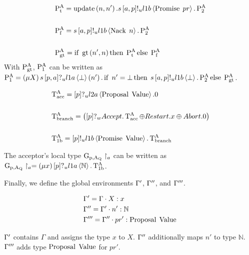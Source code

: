 \begin{align*}
&\operatorname{P^{A}_{t}} = \operatorname{update} \left(n, n'\right).s\left[a, p\right]!_u l1b \left\langle \operatorname{Promise}\; pr \right\rangle.\operatorname{P^{A}_{2}}
\\\\
&\operatorname{P^{A}_{f}} = s\left[a, p\right]!_u l1b \left\langle \operatorname{Nack}\; n \right\rangle.\operatorname{P^{A}_{2}}
\\\\
&\operatorname{P^{A}_{gt}} = \operatorname{if}\; \operatorname{gt}\left(n', n\right)\operatorname{then}\; \operatorname{P^{A}_{t}}\operatorname{else}\; \operatorname{P^{A}_{f}}
\end{align*}
With $\operatorname{P^{A}_{gt}}$, $\operatorname{P^{A}_{1}}$ can be written as $\operatorname{P^{A}_{1}} = \left(\mu X\right)s\left[p, a\right]?_u l1a \left\langle \bot \right\rangle \left(n'\right).\operatorname{if}\; n'=\bot\operatorname{then}\; s\left[a, p\right]!_u l1b \left\langle \bot \right\rangle.\operatorname{P^{A}_{2}}\operatorname{else}\; \operatorname{P^{A}_{gt}}$.

\begin{align*}    
&\operatorname{T^{A}_{acc}} = \left[p\right]?_u l2a \left\langle \operatorname{Proposal}\; \operatorname{Value} \right\rangle.0
\\\\
&\operatorname{T^{A}_{branch}} = \left(\left[p\right]?_w \mathnormal{Accept} . \operatorname{T^{A}_{acc}} \oplus \mathnormal{Restart} . x \oplus \mathnormal{Abort} .0\right)
\\\\
&\operatorname{T^{A}_{1b}} = \left[p\right]!_u l1b \left\langle \operatorname{Promise}\; \operatorname{Value} \right\rangle . \operatorname{T^{A}_{branch}}
\end{align*}

The acceptor's local type $\operatorname{G_{p, A_Q}} \upharpoonright_{a}$ can be written as $\operatorname{G_{p, A_Q}} \upharpoonright_{a} = \left(\mu x\right)\left[p\right]?_u l1a \left\langle \mathbb{N} \right\rangle.\operatorname{T^{A}_{1b}}$.

Finally, we define the global environments $\Gamma'$, $\Gamma''$, and $\Gamma'''$.

\begin{align*}
&\Gamma' = \Gamma \cdot X:x\\
&\Gamma'' = \Gamma' \cdot n':\mathbb{N}\\
&\Gamma''' = \Gamma'' \cdot pr':\operatorname{Proposal}\; \operatorname{Value}
\end{align*}

$\Gamma'$ contains $\Gamma$ and assigns the type $x$ to $X$.
$\Gamma''$ additionally maps $n'$ to type $\mathbb{N}$.
$\Gamma'''$ adds type $\operatorname{Proposal}\; \operatorname{Value}$ for $pr'$.

